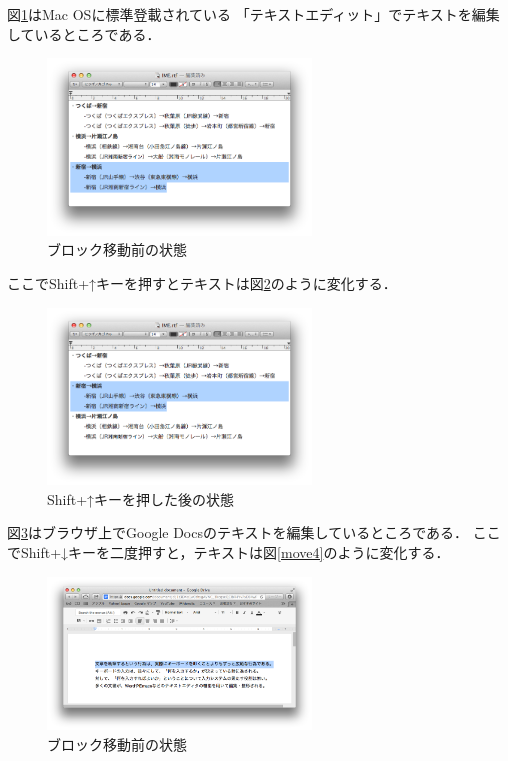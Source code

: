 図\ref{move1}はMac OSに標準登載されている
「テキストエディット」でテキストを編集しているところである．

\begin{figure}[H]
\centerline{\includegraphics[width=70mm,bb=0 0 703 472]{figures/block2.png}}
\caption{ブロック移動前の状態}
\label{move1}
\end{figure}

ここでShift+↑キーを押すとテキストは図\ref{move2}のように変化する．

\begin{figure}[H]
\centerline{\includegraphics[width=70mm,bb=0 0 703 472]{figures/block3.png}}
\caption{Shift+↑キーを押した後の状態}
\label{move2}
\end{figure}

図\ref{move3}はブラウザ上でGoogle Docsのテキストを編集しているところである．
ここでShift+↓キーを二度押すと，テキストは図\ref{move4}のように変化する．

\begin{figure}[H]
\centerline{\includegraphics[width=70mm,bb=0 0 935 542]{figures/block4.png}}
\caption{ブロック移動前の状態}
\label{move3}
\end{figure}

